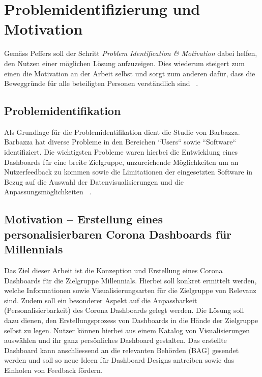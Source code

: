 \section{Problemidentifizierung und Motivation}
Gemäss Peffers soll der Schritt \textit{Problem Identification \& Motivation} dabei helfen, den Nutzen einer möglichen Lösung aufzuzeigen. Dies wiederum steigert zum einen die Motivation an der Arbeit selbst und sorgt zum anderen dafür, dass die Beweggründe für alle beteiligten Personen verständlich sind ~\citep[S. 52 + 55]{peffers}.


\subsection{Problemidentifikation}
Als Grundlage für die Problemidentifikation dient die Studie von Barbazza. Barbazza hat diverse Probleme in den Bereichen ``Users`` sowie ``Software`` identifiziert. Die wichtigsten Probleme waren hierbei die Entwicklung eines Dashboards für eine breite Zielgruppe, unzureichende Möglichkeiten um an Nutzerfeedback zu kommen sowie die Limitationen der eingesetzten Software in Bezug auf die Auswahl der Datenvisualisierungen und die Anpassungsmöglichkeiten ~\citep[S. 14-15]{barbazza}.

\subsection{Motivation – Erstellung eines personalisierbaren Corona Dashboards für Millennials}
Das Ziel dieser Arbeit ist die Konzeption und Erstellung eines Corona Dashboards für die Zielgruppe Millennials. Hierbei soll konkret ermittelt werden, welche Informationen sowie Visualisierungsarten für die Zielgruppe von Relevanz sind. Zudem soll ein besonderer Aspekt auf die Anpassbarkeit (Personalisierbarkeit) des Corona Dashboards gelegt werden. Die Lösung soll dazu dienen, den Erstellungsprozess von Dashboards in die Hände der Zielgruppe selbst zu legen. Nutzer können hierbei aus einem Katalog von Visualisierungen auswählen und ihr ganz persönliches Dashboard gestalten. Das erstellte Dashboard kann anschliessend an die relevanten Behörden (BAG) gesendet werden und soll so neue Ideen für Dashboard Designs antreiben sowie das Einholen von Feedback fördern.
